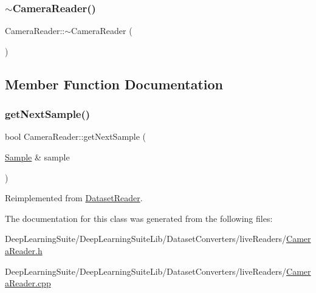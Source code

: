 \mbox{\label{class_camera_reader_a8d12e1db2e1f910ec89ed1e4bdd73392}} 
\subsubsection{\texorpdfstring{$\sim$\+Camera\+Reader()}{~CameraReader()}}
{\footnotesize\ttfamily Camera\+Reader\+::$\sim$\+Camera\+Reader (\begin{DoxyParamCaption}{ }\end{DoxyParamCaption})}



\subsection{Member Function Documentation}
\mbox{\label{class_camera_reader_a1b78cca892789abc2294d56afab3146d}} 
\subsubsection{\texorpdfstring{get\+Next\+Sample()}{getNextSample()}}
{\footnotesize\ttfamily bool Camera\+Reader\+::get\+Next\+Sample (\begin{DoxyParamCaption}\item[{\hyperlink{struct_sample}{Sample} \&}]{sample }\end{DoxyParamCaption})\hspace{0.3cm}{\ttfamily [virtual]}}



Reimplemented from \hyperlink{class_dataset_reader_af50668f52c34f4620c44e91f26dd11ce}{Dataset\+Reader}.



The documentation for this class was generated from the following files\+:\begin{DoxyCompactItemize}
\item 
Deep\+Learning\+Suite/\+Deep\+Learning\+Suite\+Lib/\+Dataset\+Converters/live\+Readers/\hyperlink{_camera_reader_8h}{Camera\+Reader.\+h}\item 
Deep\+Learning\+Suite/\+Deep\+Learning\+Suite\+Lib/\+Dataset\+Converters/live\+Readers/\hyperlink{_camera_reader_8cpp}{Camera\+Reader.\+cpp}\end{DoxyCompactItemize}
